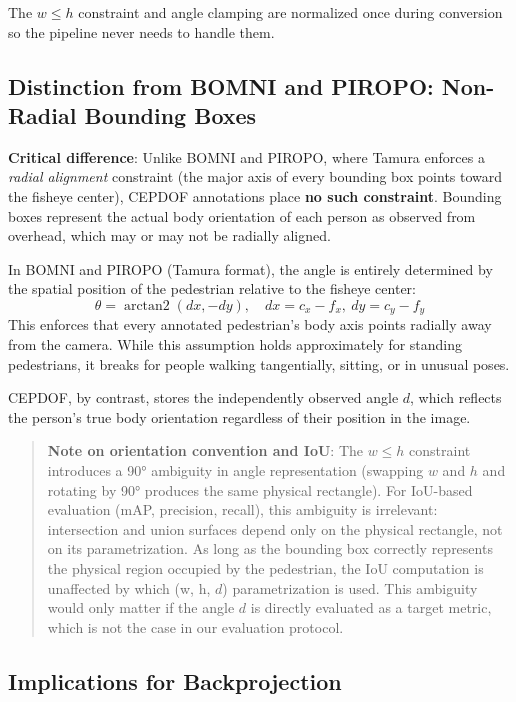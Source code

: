 \documentclass[11pt]{article}
\DeclareMathOperator{\arctantwo}{arctan2}
\begin{document}
The $w \leq h$ constraint and angle clamping are normalized once during conversion so the pipeline never needs to handle them.

\subsection{Distinction from BOMNI and PIROPO: Non-Radial Bounding Boxes}

\textbf{Critical difference}: Unlike BOMNI and PIROPO, where Tamura enforces a \textit{radial alignment} constraint (the major axis of every bounding box points toward the fisheye center), CEPDOF annotations place \textbf{no such constraint}. Bounding boxes represent the actual body orientation of each person as observed from overhead, which may or may not be radially aligned.

In BOMNI and PIROPO (Tamura format), the angle is entirely determined by the spatial position of the pedestrian relative to the fisheye center:
\begin{equation}
    \theta = \arctantwo(dx, -dy), \quad dx = c_x - f_x,\ dy = c_y - f_y
\end{equation}
This enforces that every annotated pedestrian's body axis points radially away from the camera. While this assumption holds approximately for standing pedestrians, it breaks for people walking tangentially, sitting, or in unusual poses.

CEPDOF, by contrast, stores the independently observed angle $d$, which reflects the person's true body orientation regardless of their position in the image.

\begin{quote}
\textbf{Note on orientation convention and IoU}: The $w \leq h$ constraint introduces a 90° ambiguity in angle representation (swapping $w$ and $h$ and rotating by 90° produces the same physical rectangle). For IoU-based evaluation (mAP, precision, recall), this ambiguity is irrelevant: intersection and union surfaces depend only on the physical rectangle, not on its parametrization. As long as the bounding box correctly represents the physical region occupied by the pedestrian, the IoU computation is unaffected by which (w, h, $d$) parametrization is used. This ambiguity would only matter if the angle $d$ is directly evaluated as a target metric, which is not the case in our evaluation protocol.
\end{quote}

\subsection{Implications for Backprojection}
\end{document}
